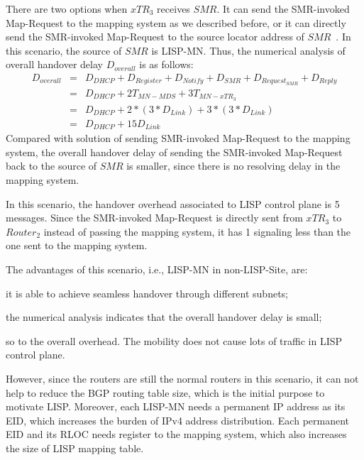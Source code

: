 There are two options when $xTR_3$ receives $SMR$. It can send the SMR-invoked Map-Request to the mapping system as we described before, or it can directly send the SMR-invoked Map-Request to the source locator address of $SMR$~\cite{rfc6830}. In this scenario, the source of $SMR$ is LISP-MN. Thus, the numerical analysis of overall handover delay $D_{overall}$ is as follows:
\begin{eqnarray}
D_{overall} &=& D_{DHCP} + D_{Register} + D_{Notify} + D_{SMR} + D_{Request_{SMR}} + D_{Reply} \nonumber \\
&=& D_{DHCP} + 2T_{MN-MDS} + 3T_{MN-xTR_3}  \nonumber \\
&=& D_{DHCP} + 2* (3*D_{Link}) + 3*(3*D_{Link}) \nonumber \\
&=& D_{DHCP} + 15D_{Link}
\end{eqnarray}
Compared with solution of sending SMR-invoked Map-Request to the mapping system, the overall handover delay of sending the SMR-invoked Map-Request back to the source of $SMR$ is smaller, since there is no resolving delay in the mapping system. %

In this scenario, the handover overhead associated to LISP control plane is 5 messages. Since the SMR-invoked Map-Request is directly sent from $xTR_3$ to $Router_2$ instead of passing the mapping system, it has 1 signaling less than the one sent to the mapping system.

The advantages of this scenario, i.e., LISP-MN in non-LISP-Site, are: 
\begin{inparaenum}[1)]
	\item it is able to achieve seamless handover through different subnets;
	\item the numerical analysis indicates that the overall handover delay is small;
	\item so to the overall overhead. The mobility does not cause lots of traffic in LISP control plane.
\end{inparaenum}
However, since the routers are still the normal routers in this scenario, it can not help to reduce the BGP routing table size, which is the initial purpose to motivate LISP. Moreover, each LISP-MN needs a permanent IP address as its EID, which increases the burden of IPv4 address distribution. Each permanent EID and its RLOC needs register to the mapping system, which also increases the size of LISP mapping table.

